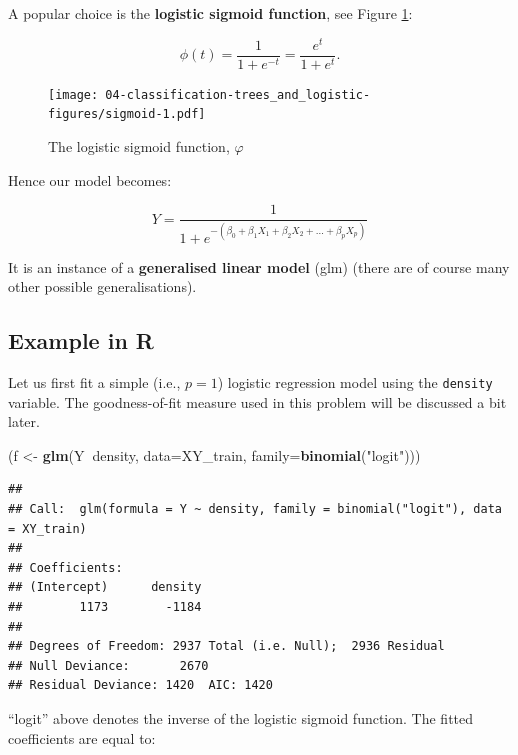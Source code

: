 \documentclass[10pt,b5paper,krantz1]{krantz}
\newenvironment{Shaded}{\begin{snugshade}}{\end{snugshade}}
\newcommand{\DataTypeTok}[1]{\textcolor[rgb]{0.27,0.27,0.27}{#1}}
\newcommand{\KeywordTok}[1]{\textcolor[rgb]{0.27,0.27,0.27}{\textbf{#1}}}
\newcommand{\NormalTok}[1]{#1}
\newcommand{\OperatorTok}[1]{\textcolor[rgb]{0.43,0.43,0.43}{\textbf{#1}}}
\newcommand{\StringTok}[1]{\textcolor[rgb]{0.5,0.5,0.5}{#1}}
\begin{document}
A popular choice is the \textbf{logistic sigmoid function},
see Figure \ref{fig:sigmoid}:

\[
\phi(t) = \frac{1}{1+e^{-t}} = \frac{e^t}{1+e^t}.
\]

\begin{figure}
\hypertarget{fig:sigmoid}{%
\centering
\texttt{[image: 04-classification-trees\_and\_logistic-figures/sigmoid-1.pdf]}
\caption{The logistic sigmoid function, \(\varphi\)}\label{fig:sigmoid}
}
\end{figure}

Hence our model becomes:

\[
Y=\frac{1}{1+e^{-(\beta_0 + \beta_1 X_1 + \beta_2 X_2 + \dots + \beta_p X_p)}}
\]

It is an instance of a \textbf{generalised linear model} (glm)
(there are of course many other possible generalisations).

\hypertarget{example-in-r-2}{%
\subsection{Example in R}\label{example-in-r-2}}

Let us first fit a simple (i.e., \(p=1\)) logistic regression model
using the \texttt{density} variable. The goodness-of-fit measure used in this
problem will be discussed a bit later.

\begin{Shaded}
\begin{Highlighting}[]
\NormalTok{(f <-}\StringTok{ }\KeywordTok{glm}\NormalTok{(Y}\OperatorTok{~}\NormalTok{density, }\DataTypeTok{data=}\NormalTok{XY_train, }\DataTypeTok{family=}\KeywordTok{binomial}\NormalTok{(}\StringTok{"logit"}\NormalTok{)))}
\end{Highlighting}
\end{Shaded}

\begin{verbatim}
## 
## Call:  glm(formula = Y ~ density, family = binomial("logit"), data = XY_train)
## 
## Coefficients:
## (Intercept)      density  
##        1173        -1184  
## 
## Degrees of Freedom: 2937 Total (i.e. Null);  2936 Residual
## Null Deviance:       2670 
## Residual Deviance: 1420  AIC: 1420
\end{verbatim}

``logit'' above denotes the inverse of the logistic sigmoid function.
The fitted coefficients are equal to:

\begin{Shaded}
\end{Shaded}
\end{document}
